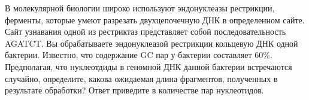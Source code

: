 
В молекулярной биологии
широко используют эндонуклеазы рестрикции, ферменты, которые умеют разрезать
двухцепочечную ДНК в определенном сайте. Сайт узнавания одной из рестриктаз
представляет собой последовательность AGATCT. Вы обрабатываете эндонуклеазой
рестрикции кольцевую ДНК одной бактерии. Известно, что содержание GC пар у
бактерии составляет $60\%$. 
Предполагая, что нуклеотдиды в геномной ДНК данной бактерии встречаются случайно, определите, какова ожидаемая длина фрагментов, полученных в
результате обработки? Ответ приведите в количестве пар нуклеотидов.

\explanationSection

